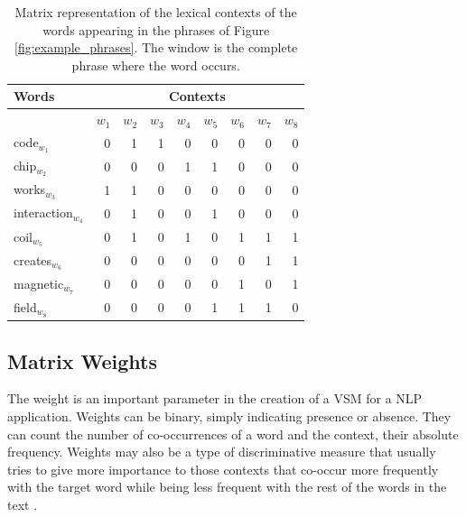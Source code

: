 \begin{table}[]
\centering
\caption{Matrix representation of the lexical contexts of the words appearing in the phrases of Figure \ref{fig:example_phrases}. The window is the complete phrase where the word occurs.}
\label{tab:lexical_matrix}
\begin{tabular}{@{}lrrrrrrrr@{}}
\toprule
 Words & \multicolumn{8}{c}{Contexts} \\ \midrule
       & $w_1$ & $w_2$ & $w_3$ & $w_4$ & $w_5$ & $w_6$ & $w_7$ & $w_8$ \\ \midrule
code$_{w_1}$        & 0    & 1    & 1     & 0           & 0    & 0       & 0        & 0     \\
chip$_{w_2}$        & 0    & 0    & 0     & 1           & 1    & 0       & 0        & 0     \\
works$_{w_3}$       & 1    & 1    & 0     & 0           & 0    & 0       & 0        & 0     \\
interaction$_{w_4}$ & 0    & 1    & 0     & 0           & 1    & 0       & 0        & 0     \\
coil$_{w_5}$        & 0    & 1    & 0     & 1           & 0    & 1       & 1        & 1     \\
creates$_{w_6}$     & 0    & 0    & 0     & 0           & 0    & 0       & 1        & 1     \\
magnetic$_{w_7}$    & 0    & 0    & 0     & 0           & 0    & 1       & 0        & 1     \\
field$_{w_8}$       & 0    & 0    & 0     & 0           & 1    & 1       & 1        & 0     \\ \bottomrule
\end{tabular}
\end{table}

\subsection{Matrix Weights}

The weight is an important parameter in the creation of a VSM for a NLP application. Weights can be binary, simply  indicating presence or absence. They can count the number of co-occurrences of a word and the context, their absolute frequency. Weights may also be a type of discriminative measure that usually tries to give more importance to those contexts that co-occur more frequently with the target word while being less frequent  with the rest of the words in the text \cite{JurafskyM09,ClarkBook2010}.  

